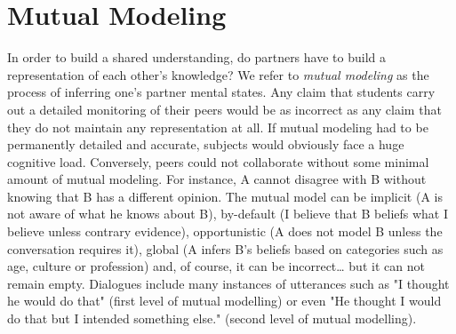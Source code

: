 \documentclass[twocolumn]{article}
\begin{document}
%
%
%

\section{Mutual Modeling}


In order to build a shared understanding, do partners have to build a
representation of each other's knowledge? We refer to \emph{mutual modeling} as
the process of inferring one's partner mental states. Any claim that students
carry out a detailed monitoring of their peers would be as incorrect as any
claim that they do not maintain any representation at all. If mutual modeling
had to be permanently detailed and accurate, subjects would obviously face a
huge cognitive load. Conversely, peers could not collaborate without some
minimal amount of mutual modeling. For instance, A cannot disagree with B
without knowing that B has a different opinion. The mutual model can be implicit
(A is not aware of what he knows about B), by-default (I believe that B beliefs
what I believe unless contrary evidence), opportunistic (A does not model B
unless the conversation requires it), global (A infers B's beliefs based on
categories such as age, culture or profession) and, of course, it can be
incorrect… but it can not remain empty. Dialogues include many instances of
utterances such as "I thought he would do that" (first level of mutual
modelling) or even "He thought I would do that but I intended something else."
(second level of mutual modelling).
\end{document}
